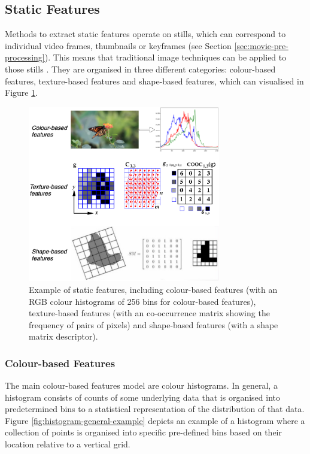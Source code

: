 
\subsection{Static Features}
\label{sec:litsurvey-static-features}

Methods to extract static features operate on stills, which can correspond to individual video frames, thumbnails or keyframes (see Section \ref{sec:movie-pre-processing}). This means that traditional image techniques can be applied to those stills \cite{hu2011survey}. They are organised in three different categories: colour-based features, texture-based features and shape-based features, which can visualised in Figure \ref{fig:colour-texture-shape-features}.

\begin{figure}[h]
\centerline{\includegraphics[width=0.75\textwidth]{figures/litsurvey/colour-texture-shape-features.png}}
\caption{\label{fig:colour-texture-shape-features}Example of static features, including colour-based features (with an RGB colour histograms of 256 bins for colour-based features), texture-based features (with an co-occurrence matrix showing the frequency of pairs of pixels) and shape-based features (with a shape matrix descriptor).}
\end{figure}

\subsubsection{Colour-based Features}
\label{sec:color-based-features}

The main colour-based features model are colour histograms. In general, a histogram consists of counts of some underlying data that is organised into predetermined bins to a statistical representation of the distribution of that data. Figure \ref{fig:histogram-general-example} depicts an example of a histogram where a collection of points is organised into specific pre-defined bins based on their location relative to a vertical grid.

